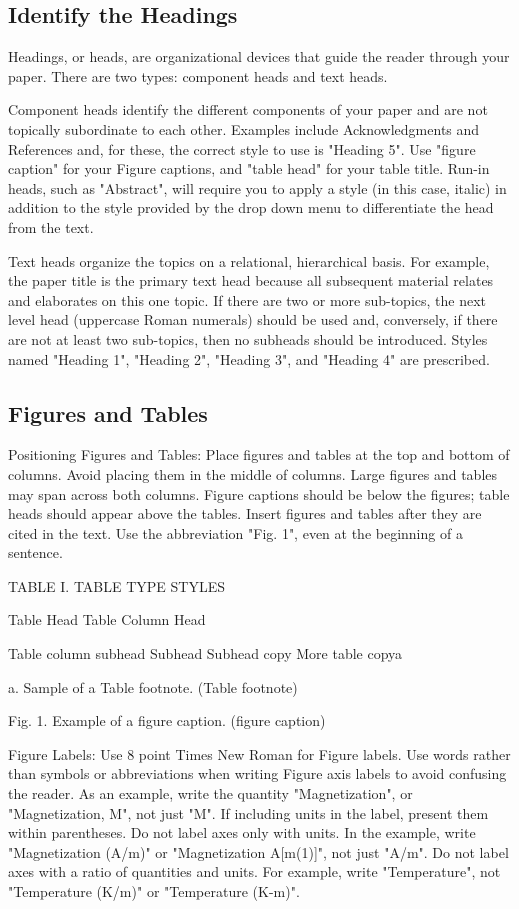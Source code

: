 \documentclass[10pt, conference, compsocconf]{IEEEtran}
\begin{document}
\subsection{Identify the Headings}
Headings, or heads, are organizational devices that guide the reader through your paper. There are two types: component heads and text heads.

Component heads identify the different components of your paper and are not topically subordinate to each other. Examples include Acknowledgments and References and, for these, the correct style to use is "Heading 5". Use "figure caption" for your Figure captions, and "table head" for your table title. Run-in heads, such as "Abstract", will require you to apply a style (in this case, italic) in addition to the style provided by the drop down menu to differentiate the head from the text.

Text heads organize the topics on a relational, hierarchical basis. For example, the paper title is the primary text head because all subsequent material relates and elaborates on this one topic. If there are two or more sub-topics, the next level head (uppercase Roman numerals) should be used and, conversely, if there are not at least two sub-topics, then no subheads should be introduced. Styles named "Heading 1", "Heading 2", "Heading 3", and "Heading 4" are prescribed.

\subsection{Figures and Tables}
Positioning Figures and Tables: Place figures and tables at the top and bottom of columns. Avoid placing them in the middle of columns. Large figures and tables may span across both columns. Figure captions should be below the figures; table heads should appear above the tables. Insert figures and tables after they are cited in the text. Use the abbreviation "Fig. 1", even at the beginning of a sentence.

TABLE I. 	TABLE TYPE STYLES

Table Head	Table Column Head

	Table column subhead	Subhead	Subhead
copy	More table copya		

a.	Sample of a Table footnote. (Table footnote)

Fig. 1.	Example of a figure caption. (figure caption)

Figure Labels: Use 8 point Times New Roman for Figure labels. Use words rather than symbols or abbreviations when writing Figure axis labels to avoid confusing the reader. As an example, write the quantity "Magnetization", or "Magnetization, M", not just "M". If including units in the label, present them within parentheses. Do not label axes only with units. In the example, write "Magnetization (A/m)" or "Magnetization {A[m(1)]}", not just "A/m". Do not label axes with a ratio of quantities and units. For example, write "Temperature", not "Temperature (K/m)" or "Temperature (K-m)".
\end{document}
